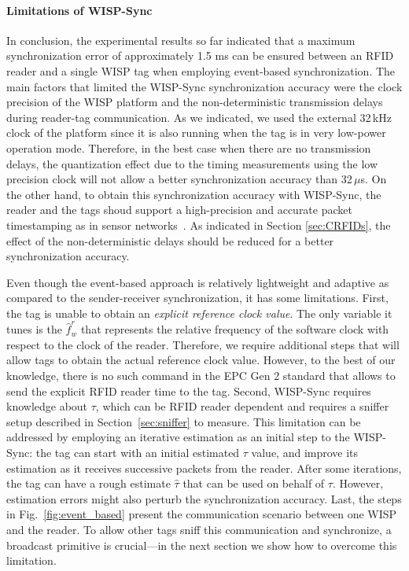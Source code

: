 \documentclass[journal,draftcls,onecolumn,12pt,twoside]{IEEEtranTCOM}
\begin{document}
\paragraph{Limitations of WISP-Sync}

In conclusion, the experimental results so far indicated that a maximum synchronization error of approximately 1.5 ms can be ensured between an RFID reader and a single WISP tag when employing event-based synchronization. The main factors that limited the WISP-Sync synchronization accuracy were the clock precision of the WISP platform and the non-deterministic transmission delays during reader-tag communication. As we indicated, we used the external 32\,kHz clock of the platform since it is also running when the tag is in very low-power operation mode. Therefore, in the best case when there are no transmission delays, the quantization effect due to the timing measurements using the low precision clock will not allow a better synchronization accuracy than 32\,$\mu$s. On the other hand, to obtain this synchronization accuracy with WISP-Sync, the reader and the tags shoud support a high-precision and accurate packet timestamping as in sensor networks~\cite{Maroti2004}. As indicated in Section \ref{sec:CRFIDs}, the effect of the non-deterministic delays should be reduced for a better synchronization accuracy.

Even though the event-based approach is relatively lightweight and adaptive as compared to the sender-receiver synchronization, it has some limitations. First, the tag is unable to obtain an \emph{explicit reference clock value}. The only variable it tunes is the $\hat{f}_w^r$ that represents the relative frequency of the software clock with respect to the clock of the reader. Therefore, we require additional steps that will allow tags to obtain the actual reference clock value. However, to the best of our knowledge, there is no such command in the EPC Gen 2 standard that allows to send the explicit RFID reader time to the tag. Second, WISP-Sync requires knowledge about $\tau$, which can be RFID reader dependent and requires a sniffer setup described in Section~\ref{sec:sniffer} to measure. This limitation can be addressed by employing an iterative estimation as an initial step to the WISP-Sync: the tag can start with an initial estimated $\tau$ value, and improve its estimation as it receives successive packets from the reader. After some iterations, the tag can have a rough estimate $\hat{\tau}$ that can be used on behalf of $\tau$. However, estimation errors might also perturb the synchronization accuracy. Last, the steps in Fig.~\ref{fig:event_based} present the communication scenario between one WISP and the reader. To allow other tags sniff this communication and synchronize, a broadcast primitive is crucial---in the next section we show how to overcome this limitation.
\end{document}
